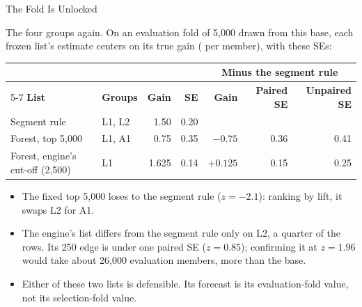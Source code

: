\documentclass[aspectratio=169, 11pt, handout]{beamer}
\begin{document}
\begin{frame}{The Fold Is Unlocked}

The four groups again. On an evaluation fold of 5{,}000 drawn from this base, each frozen list's estimate centers on its true gain (\textyen{} per member), with these SEs:

\begin{center}
\small
\begin{tabular}{llrrrrr}
\toprule
& & & & \multicolumn{3}{c}{\textbf{Minus the segment rule}} \\
\cmidrule(lr){5-7}
\textbf{List} & \textbf{Groups} & \textbf{Gain} & \textbf{SE} & \textbf{Gain} & \textbf{Paired SE} & \textbf{Unpaired SE} \\
\midrule
Segment rule & L1, L2 & 1.50 & 0.20 & & & \\
Forest, top 5{,}000 & L1, A1 & 0.75 & 0.35 & $-0.75$ & 0.36 & 0.41 \\
Forest, engine's cut-off (2{,}500) & L1 & 1.625 & 0.14 & $+0.125$ & 0.15 & 0.25 \\
\bottomrule
\end{tabular}
\end{center}

\begin{itemize}
  \item The fixed top 5{,}000 loses to the segment rule ($z = -2.1$): ranking by lift, it swaps L2 for A1.
  \item The engine's list differs from the segment rule only on L2, a quarter of the rows. Its 250 edge is under one paired SE ($z = 0.85$); confirming it at $z = 1.96$ would take about 26{,}000 evaluation members, more than the base.
  \item Either of these two lists is defensible. Its forecast is its evaluation-fold value, not its selection-fold value.
\end{itemize}
\end{frame}
\end{document}
